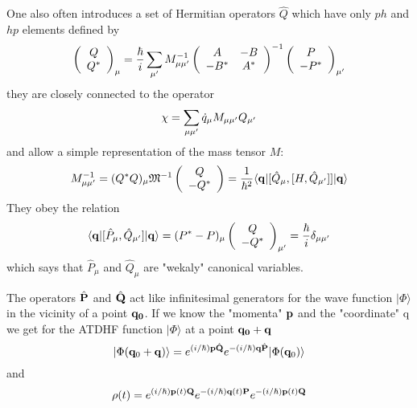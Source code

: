   \vspace{8pt}

  One also often introduces a set of Hermitian operators $\hat{Q}$ which have only $ph$ and $hp$ elements defined by 
  \begin{equation}
    \left(      
      \begin{array}{c}      \label{tdhf140}
        Q \\
        Q^*
      \end{array}
    \right)_{\mu} = \frac{\hbar}{i}\sum_{\mu\rq} M^{-1}_{\mu\mu\rq}
    \left(
      \begin{array}{cc}
        A    & -B \\
        -B^* & A^*
      \end{array}
    \right)^{-1}
    \left(
      \begin{array}{c}
        P \\
        -P^*
      \end{array}
    \right)_{\mu\rq}   
  \end{equation}
  they are closely connected to the operator
  \begin{equation}
    \chi = \sum_{\mu\mu\rq}\dot{q}_\mu M_{\mu\mu\rq}Q_{\mu\rq}	 \label{tdhf141}
  \end{equation}
  and allow a simple representation of the mass tensor $M$:
  \begin{equation}
    M^{-1}_{\mu\mu\rq} = (Q^* Q)_{\mu}\mathfrak{M}^{-1}	 \label{tdhf142}
    \left(
      \begin{array}{c}
        Q     \\
        -Q^* 
      \end{array}
    \right)
    = \frac{1}{\hbar^2}\langle {\bf{q}} | [\hat{Q}_\mu, [H, \hat{Q}_{\mu\rq}]] | {\bf{q}} \rangle
  \end{equation}
  They obey the relation
  \begin{equation}
    \langle {\bf{q}} | [\hat{P}_\mu, \hat{Q}_{\mu\rq}] | {\bf{q}} \rangle = (P^* -P)_\mu 
    \left(
      \begin{array}{c}
        Q     \\
        -Q^* 
      \end{array}
    \right)_{\mu\rq}
    = \frac{\hbar}{i}\delta_{\mu\mu\rq}
     	 \label{tdhf143}
  \end{equation}
  which says that $\hat{P}_\mu$ and $\hat{Q}_\mu$ are "wekaly" canonical variables.
  
  The operators $\hat{{\bf{P}}}$ and $\hat{{\bf{Q}}}$ act like infinitesimal generators for the wave function $|\Phi\rangle$ in the vicinity of a point ${\bf{q}_0}$. If we know the "momenta" ${\bf{p}}$ and the "coordinate" q we get for the ATDHF function $|\Phi\rangle$ at a point ${\bf{q}_0}+ {\bf{q}}$ 
\begin{equation}
  | \Phi({{\bf{q}}_0}+ {\bf{q}}) \rangle = e^{(i/\hbar) {\bf{p}} \hat{{\bf{Q}}} }	e^{-(i/\hbar) {\bf{q}} \hat{{\bf{P}}} }| \Phi({{\bf{q}}_0}) \rangle \label{tdhf144}
\end{equation}
and
\begin{equation}
  \rho(t) = e^{(i/\hbar) {\bf{p}}(t) {\bf{Q}} } e^{-(i/\hbar) {\bf{q}}(t) {\bf{P}} } e^{-(i/\hbar) {\bf{p}}(t) {\bf{Q}}}	 \label{tdhf145}
\end{equation}
